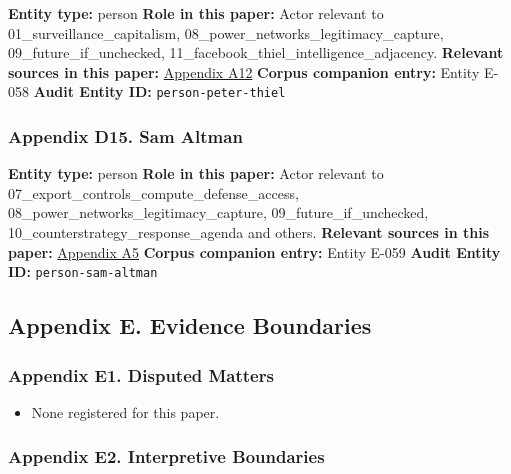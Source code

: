 \documentclass[
  american,
  11pt,
  letterpaper,
]{article}
\providecommand{\tightlist}{%
  \setlength{\itemsep}{0pt}\setlength{\parskip}{0pt}}
\begin{document}
\textbf{Entity type:} person \textbf{Role in this paper:} Actor relevant
to 01\_surveillance\_capitalism,
08\_power\_networks\_legitimacy\_capture, 09\_future\_if\_unchecked,
11\_facebook\_thiel\_intelligence\_adjacency. \textbf{Relevant sources
in this paper:}
\hyperref[ch-07-appendix-a12-meta-platforms-inc-2022-definitive-proxy-statement]{Appendix
A12} \textbf{Corpus companion entry:} Entity E-058 \textbf{Audit Entity
ID:} \texttt{person-peter-thiel}

\subsubsection{Appendix D15. Sam
Altman}\label{ch-07-appendix-d15-sam-altman}

\textbf{Entity type:} person \textbf{Role in this paper:} Actor relevant
to 07\_export\_controls\_compute\_defense\_access,
08\_power\_networks\_legitimacy\_capture, 09\_future\_if\_unchecked,
10\_counterstrategy\_response\_agenda and others. \textbf{Relevant
sources in this paper:}
\hyperref[ch-07-appendix-a5-openais-proposals-for-the-us-ai-action-plan]{Appendix
A5} \textbf{Corpus companion entry:} Entity E-059 \textbf{Audit Entity
ID:} \texttt{person-sam-altman}

\subsection{Appendix E. Evidence
Boundaries}\label{appendix-e.-evidence-boundaries-7}

\subsubsection{Appendix E1. Disputed
Matters}\label{ch-07-appendix-e1-disputed-matters}

\begin{itemize}
\tightlist
\item
  None registered for this paper.
\end{itemize}

\subsubsection{Appendix E2. Interpretive
Boundaries}\label{ch-07-appendix-e2-interpretive-boundaries}
\end{document}
